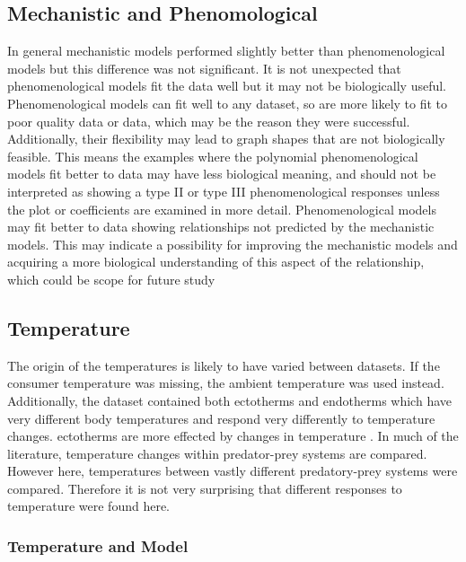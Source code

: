 \documentclass{article}
\begin{document}
\subsection{Mechanistic and Phenomological }
In general mechanistic models performed slightly better than phenomenological models but this difference was not significant. It is not unexpected that phenomenological models fit the data well but it may not be biologically useful. Phenomenological models can fit well to any dataset, so are more likely to fit to poor quality data or data, which may be the reason they were successful. Additionally, their flexibility may lead to graph shapes that are not biologically feasible. This means the examples where the polynomial phenomenological models fit better to data may have less biological meaning, and should not be interpreted as showing a type II or type III phenomenological responses unless the plot or coefficients are examined in more detail. Phenomenological models may fit better to data showing relationships not predicted by the mechanistic models. This may indicate a possibility for improving the mechanistic models and acquiring a more biological understanding of this aspect of the relationship, which could be scope for future study
\subsection{Temperature}
The origin of the temperatures is likely to have varied between datasets. If the consumer temperature was missing, the ambient temperature was used instead. Additionally, the dataset contained both ectotherms and endotherms which have very different body temperatures and respond very differently to temperature changes. ectotherms are more effected by changes in temperature \cite{Dell2014TemperatureStrategy}.
In much of the literature, temperature changes within predator-prey systems are compared. However here, temperatures between vastly different predatory-prey systems were compared. Therefore it is not very surprising that different responses to temperature were found here. 
\subsubsection{Temperature and Model}
\end{document}
